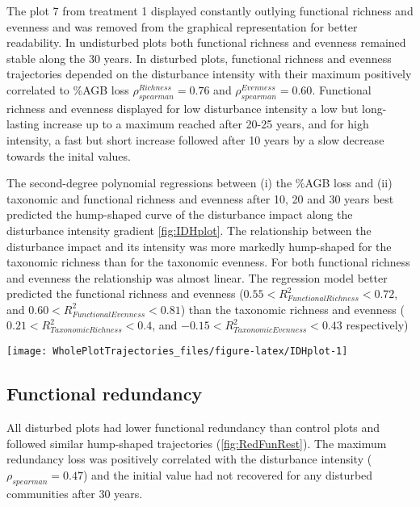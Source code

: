 \documentclass[fleqn,10pt]{ArtEcoFoG} %
\begin{document}
The plot 7 from treatment 1 displayed constantly outlying functional
richness and evenness and was removed from the graphical representation
for better readability. In undisturbed plots both functional richness
and evenness remained stable along the 30 years. In disturbed plots,
functional richness and evenness trajectories depended on the
disturbance intensity with their maximum positively correlated to \%AGB
loss \(\rho_{spearman}^{Richness}=0.76\) and
\(\rho_{spearman}^{Evenness}=0.60\). Functional richness and evenness
displayed for low disturbance intensity a low but long-lasting increase
up to a maximum reached after 20-25 years, and for high intensity, a
fast but short increase followed after 10 years by a slow decrease
towards the inital values.

The second-degree polynomial regressions between (i) the \%AGB loss and
(ii) taxonomic and functional richness and evenness after 10, 20 and 30
years best predicted the hump-shaped curve of the disturbance impact
along the disturbance intensity gradient \ref{fig:IDHplot}. The
relationship between the disturbance impact and its intensity was more
markedly hump-shaped for the taxonomic richness than for the taxonomic
evenness. For both functional richness and evenness the relationship was
almost linear. The regression model better predicted the functional
richness and evenness (\(0.55<R^2_{Functional Richness}<0.72\), and
\(0.60<R^2_{Functional Evenness}<0.81\)) than the taxonomic richness and
evenness (\(0.21<R^2_{Taxonomic Richness}<0.4\), and
\(-0.15<R^2_{Taxonomic Evenness}<0.43\) respectively)

\begin{figure*}

{\centering \texttt{[image: WholePlotTrajectories\_files/figure-latex/IDHplot-1]} 

}

\caption{Relationship between the initial \%AGB loss and community taxonmic richness \textbf{(a)}, taxonomic evenness \textbf{(b)}, functional richness \textbf{(c)},and functional evenness \textbf{(d)} at 10, 20 and 30 years after disturbance}\label{fig:IDHplot}
\end{figure*}

\subsection{Functional redundancy}\label{functional-redundancy}

All disturbed plots had lower functional redundancy than control plots
and followed similar hump-shaped trajectories (\ref{fig:RedFunRest}).
The maximum redundancy loss was positively correlated with the
disturbance intensity (\(\rho_{spearman}=0.47\)) and the initial value
had not recovered for any disturbed communities after 30 years.
\end{document}
